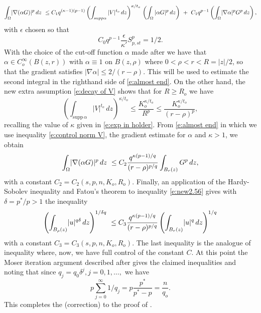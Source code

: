 \documentclass[10pt]{amsart}
\begin{document}
\begin{equation}\label{e:almost end}
\int_\Omega \abs {\nabla(\alpha G)}^p\, dz\ \leq  C_1{q^{(\kappa-1)(p-1)}}\left (\int_{supp \alpha} |V|^{t_o}\,dz\right)^{\kappa/{t_o}}\,\left( \int_\Omega  {|\alpha G|^{p}}\,dz\right)\ + \ C_1q^{p-1}\left ( \int_\Omega \abs {\nabla \alpha}^p
G^p\, dz\right ),
\end{equation}
with $\epsilon$ chosen so that
\[
C_0q^{p-1}\frac {\epsilon}{\kappa'}S^p_{p,st}=1/2.
\]
With the choice of the cut-off function $\alpha$ made after \cite[(2.57)]{V11} we have that $\alpha\in C^\infty_o(B(z,r))$ with $\alpha\equiv 1$ on $B(z,\rho)$ where $0<\rho<r<R=|z|/2$, so that the gradient satisfies $|\nabla \alpha|\leq 2/(r-\rho)$. This will be used to estimate the second integral in the righthand side of \eqref{e:almost end}.
On the other hand, the new extra assumption \eqref{e:decay of V} shows that for $R\geq R_o$ we have
\begin{equation}\label{e:control norm V}
\left (\int_{\mathrm{supp}\, \alpha} |V|^{t_o}\,dz\right)^{\kappa/{t_o}}\leq \frac {K_o^{\kappa/{t_o}}}{R^p}\leq \frac {K_o^{\kappa/{t_o}}}{(r-\rho)^p},
\end{equation}
recalling the value of $\kappa$ given in \eqref{e:exp in holder}.
From \eqref{e:almost end} in which we use inequality \eqref{e:control norm V}, the gradient estimate for $\alpha$ and $\kappa>1$, we obtain
\begin{equation}\label{e:new2.56}
\int_\Omega \lvert \nabla(\alpha G) \rvert^p\, dz\ \leq C_2 \frac {q^{\kappa(p-1)/q}} {(r-\rho)^{p/q}} \int_{B_r(z)}  {G}^p\, dz,
\end{equation}
with a constant $C_2=C_2(s,p,n, K_o,R_o)$.
Finally, an application of the Hardy-Sobolev inequality and Fatou's theorem to inequality  \eqref{e:new2.56}  gives with $\delta=p^*/p>1$ the inequality
\begin{equation}\label{e:base for Moser infty}
\left(\int_{B_\rho(z)} \abs {u}^{q\delta}\, dz\right)^{1/{\delta q}}\ \leq  C_3 \frac {q^{\kappa(p-1)/q}} {(r-\rho)^{p/q}} \left (\int_{B_r(z)}  \abs {u}^q\, dz\right )^{1/q}
\end{equation}
with a constant $C_3=C_3(s,p,n, K_o,R_o)$. The last inequality is the analogue of inequality \cite[(2.58)]{V11} where, now, we have full control of the constant $C$.
At this point the Moser iteration argument described after \cite[(2.58)]{V11} gives the claimed inequalities \cite[(2.47)]{V11} and \cite[(2.48)]{V11}
noting that since $q_j=q_0\delta^j, j=0,1,\dots,$ we have
\[
p\sum_{j=0}^\infty  {1}/{q_j}=p\frac {p^*}{p^*-p}=\frac {n}{q_o}.%
\]
This completes the (correction) to the proof of \cite[Theorem 2.9]{V11}.
\end{document}
